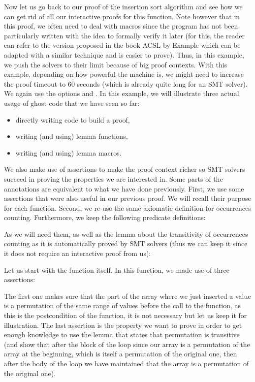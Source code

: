 Now let us go back to our proof of the insertion sort algorithm and see how we
can get rid of all our interactive proofs for this function. Note however that
in this proof, we often need to deal with macros since the program has not been
particularly written with the idea to formally verify it later (for this, the
reader can refer to the version proposed in the book ACSL by Example which can
be adapted with a similar technique and is easier to prove). Thus, in
this example, we push the solvers to their limit because of big proof contexts.
With this example, depending on how powerful the machine is, we might need to
increase the proof timeout to 60 seconds (which is already quite long for an
SMT solver). We again use the options  and
. In this example, we will illustrate three
actual usage of ghost code that we have seen so far:
\begin{itemize}
\item directly writing code to build a proof,
\item writing (and using) lemma functions,
\item writing (and using) lemma macros.
\end{itemize}


We also make use of assertions to make the proof context richer so SMT solvers
succeed in proving the properties we are interested in. Some parts of the
annotations are equivalent to what we have done previously. First, we use some
assertions that were also useful in our previous proof. We will recall their
purpose for each function. Second, we re-use the same axiomatic definition for
occurrences counting. Furthermore, we keep the following predicate definitions:




As we will need them, as well as the lemma about the transitivity of
occurrences counting as it is automatically proved by SMT solvers (thus we can
keep it since it does not require an interactive proof from us):




Let us start with the  function itself. In this
function, we made use of three assertions:




The first one makes sure that the part of the array where we just inserted a
value is a permutation of the same range of values before the call to the
 function, as this is the postcondition of the function, it
is not necessary but let us keep it for illustration. The last assertion is the
property we want to prove in order to get enough knowledge to use the lemma that
states that permutation is transitive (and show that after the block of the loop
since our array is a permutation of the array at the beginning, which is itself
a permutation of the original one, then after the body of the loop we have
maintained that the array is a permutation of the original one).



